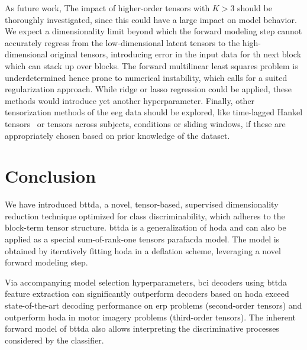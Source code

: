 \documentclass[twocolumn]{article}
\begin{document}

As future work, The impact of higher-order tensors with $K>3$ should be thoroughly
investigated, since this could have a large impact on model behavior.
We expect a dimensionality limit beyond which the forward modeling step cannot
accurately regress from the low-dimensional latent tensors to the
high-dimensional original tensors, introducing error in the input data for th
next block which can stack up over blocks.
The forward multilinear least squares problem is underdetermined hence prone to
numerical instability, which calls for a suited regularization approach.
While ridge or lasso regression could be applied, these methods would introduce
yet another hyperparameter.
Finally, other tensorization methods of the \ac{eeg} data should be explored,
like time-lagged Hankel tensors~\cite{Papy2005} or tensors across subjects,
conditions or sliding windows, if these are appropriately chosen based on prior
knowledge of the dataset.

\section{Conclusion}

We have introduced \acf{bttda}, a novel,
tensor-based, supervised dimensionality reduction technique optimized for class
discriminability, which adheres to the block-term tensor structure.
\Ac{bttda} is a generalization of \acf{hoda} and can also be
applied as a special sum-of-rank-one tensors \ac{parafacda} model.
The model is obtained by iteratively fitting \ac{hoda} in a deflation scheme,
leveraging a novel forward modeling step.

Via accompanying model selection hyperparameters, \ac{bci} decoders using
\ac{bttda} feature extraction can significantly outperform decoders based on
\ac{hoda} exceed state-of-the-art decoding performance on \acl{erp} problems
(second-order tensors) and outperform \ac{hoda} in motor imagery problems
(third-order tensors).
The inherent forward model of \ac{bttda} also allows interpreting the
discriminative processes considered by the classifier.
\end{document}
